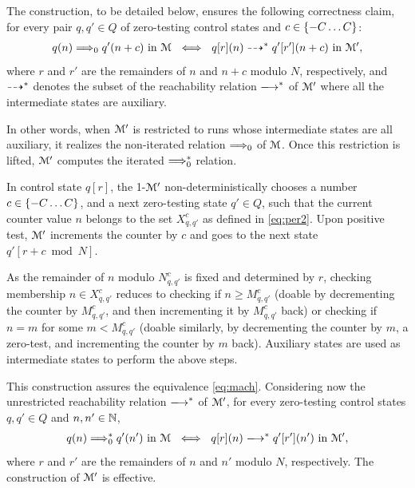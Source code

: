     The construction, %
    to be detailed below, ensures
    the following correctness claim, 
    for every pair $q,q'\in Q$ of zero-testing control states and
    $c\in\{-C\ldots C\}$:
    \begin{align} \label{eq:mach}
    {q(n) \stepp 0 {q}'(n+c)} \text{ in } \mach \ \iff \ 
    {q[r](n)\auxstep^* q'[r'](n+c) \text{ in } \mach'},
    \end{align}
    where $r$ and $r'$ are the remainders of $n$ and $n+c$ modulo $N$,
    respectively, and $\dashrightarrow^*$ denotes the subset of the reachability
    relation $\step^*$ of $\mathcal{M}'$ where all the intermediate states are
    auxiliary.

    In other words, when $\mathcal{M}'$ is restricted to runs whose intermediate
    states are all auxiliary,
    it realizes the non-iterated relation $\Longrightarrow_{0}$ of $\mathcal{M}$.
    Once this restriction is lifted, $\mathcal{M}'$ computes
    the iterated $\Longrightarrow_{0}^\ast$ relation.
    

    In control state $q[r]$, the 1-\cm $\mathcal{M}'$ non-deterministically 
    chooses a number $c\in\{-C\ldots C\}$, and a next zero-testing state 
    $q'\in Q$, such that
    the current counter value $n$ belongs to the set 
    $X^c_{q,q'}$ as defined in \eqref{eq:per2}.
    Upon positive test, $\mathcal{M}'$
    increments the counter by $c$ and goes to the next state
    $q'[r + c \bmod N]$.

    As the remainder of $n$ modulo $N^c_{q,q'}$ is fixed and determined by 
    $r$,
    checking membership $n\in X^c_{q,q'}$ reduces to checking
    if $n\geq M^c_{q,q'}$
    (doable by decrementing the counter by $M^c_{q,q'}$, and then 
    incrementing it by $M^c_{q,q'}$ back)
    or checking if $n=m$ for some $m<M^c_{q,q'}$
   (doable similarly, by decrementing the counter by $m$, a zero-test, 
   and incrementing the counter by $m$ back).
   Auxiliary states are used as intermediate states to perform the above 
   steps.

  This construction assures the equivalence \eqref{eq:mach}. Considering
  now the unrestricted reachability relation $\step^*$ of $\mathcal{M}'$,
  for every zero-testing control states $q,q'\in Q$ 
    and $n,n'\in\mathbb{N}$,
    \begin{align} \label{eq:mach2}
    {q(n) \stepp {0}^* {q}'(n')} \text{ in } \mach \ \iff \ 
    {q[r](n)\step^* q'[r'](n') \text{ in } \mach'},
    \end{align}
    where $r$ and $r'$ are the remainders of $n$ and $n'$ modulo $N$,
    respectively.
    The construction of $\mathcal{M}'$ is effective.
    
